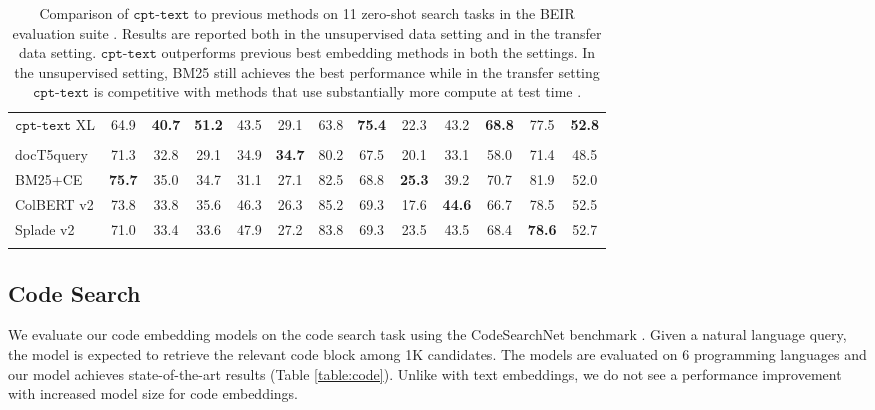 \documentclass[nohyperref]{article}
\begin{document}
\begin{table*}[]
\begin{tabular}{lcccccccccccc}
$\texttt{cpt-text}$ XL & 64.9 & \textbf{40.7} &	\textbf{51.2} &	43.5 &	29.1 &	63.8 &	\textbf{75.4} & 22.3 & 43.2 & \textbf{68.8} & 77.5 & \textbf{52.8} \\
\Xhline{1\arrayrulewidth} & \\[-1.5ex]
docT5query \cite{doct5} & 71.3 & 32.8 & 29.1 & 34.9 & \textbf{34.7} & 80.2 & 67.5 & 20.1 & 33.1 & 58.0 & 71.4 & 48.5 \\
BM25+CE \cite{mini} & \textbf{75.7} & 35.0 & 34.7 & 31.1 & 27.1 & 82.5 & 68.8 & \textbf{25.3} & 39.2 & 70.7 & 81.9 & 52.0 \\
ColBERT v2 \cite{colbert} & 73.8 & 33.8 & 35.6 & 46.3 & 26.3 & 85.2 & 69.3 & 17.6 & \textbf{44.6} & 66.7 & 78.5 & 52.5 \\
Splade v2 \cite{splade} & 71.0 & 33.4 & 33.6 & 47.9 & 27.2 & 83.8 & 69.3 & 23.5 & 43.5 & 68.4 & \textbf{78.6} & 52.7 \\
\Xhline{2.5\arrayrulewidth}
\end{tabular}
\caption{Comparison of $\texttt{cpt-text}$ to previous methods on 11 zero-shot search tasks in the BEIR evaluation suite \cite{beir}. Results are reported both in the unsupervised data setting and in the transfer data setting. $\texttt{cpt-text}$ outperforms previous best embedding methods \cite{Xiong,tas,contreiver} in both the settings. In the unsupervised setting, BM25 \cite{bm25} still achieves the best performance while in the transfer setting $\texttt{cpt-text}$ is competitive with methods that use substantially more compute at test time \cite{mini,colbert,splade}.}
\label{table:beir}
\end{table*}


\subsection{Code Search}
\label{sec:code}

We evaluate our code embedding models on the code search task using the CodeSearchNet benchmark \cite{codesearchnet}. Given a natural language query, the model is expected to retrieve the relevant code block among 1K candidates. The models are evaluated on 6 programming languages and our model achieves state-of-the-art results (Table \ref{table:code}). Unlike with text embeddings, we do not see a performance improvement with increased model size for code embeddings.
\end{document}
